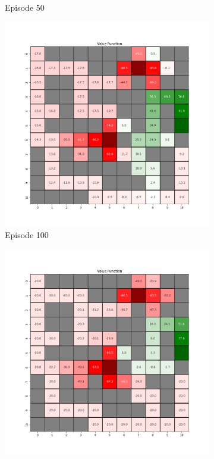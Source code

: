 \documentclass{assignment}
\begin{document}
\begin{figure}[H]
\begin{subfigure}{0.3\textwidth}
    \caption{Episode 50}
    \end{subfigure}\hfill
    \begin{subfigure}{0.3\textwidth}
        \includegraphics[width=\textwidth]{figures/value_td/alpha_sweep/value_function_alpha_0.5_gamma_0.95_epsilon_0.2_iteration_100.png}
    \caption{Episode 100}
    \end{subfigure}
    \begin{subfigure}{0.3\textwidth}
        \includegraphics[width=\textwidth]{figures/value_td/alpha_sweep/value_function_alpha_0.5_gamma_0.95_epsilon_0.2_iteration_1000.png}

\end{subfigure}
\end{figure}
\end{document}
